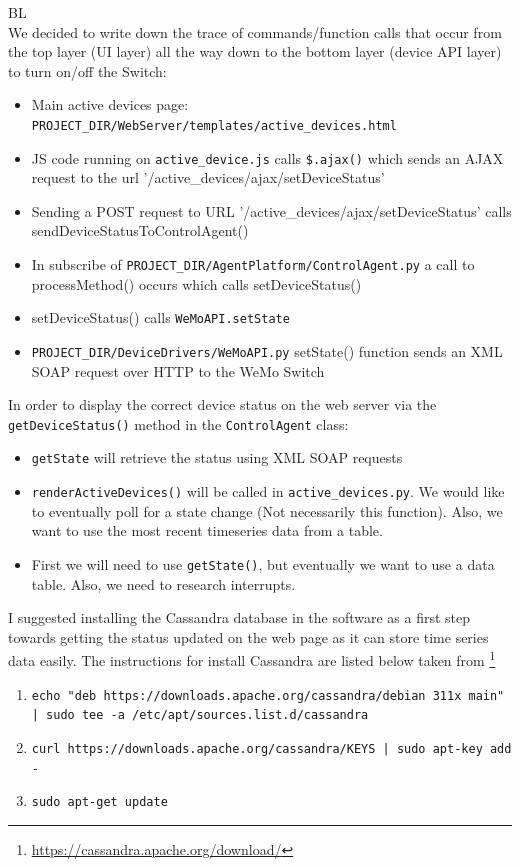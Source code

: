 \documentclass[fontsize=11pt, %
                             paper=letter, %
                             openany, %
                             captions=tableheading,
                             index=totoc,
                             hyperref]{labbook}
\begin{document}
BL\\
We decided to write down the trace of commands/function calls that occur from the top layer (UI layer) all the way down to the bottom layer (device API layer) to turn on/off the Switch:
\begin{itemize}
\item Main active devices page: \texttt{PROJECT\_DIR/WebServer/templates/active\_devices.html}
\item JS code running on \texttt{active\_device.js} calls \texttt{\$.ajax()} which sends an AJAX request to the url '/active\_devices/ajax/setDeviceStatus'
\item Sending a POST request to URL '/active\_devices/ajax/setDeviceStatus' calls sendDeviceStatusToControlAgent()
\item In subscribe of \texttt{PROJECT\_DIR/AgentPlatform/ControlAgent.py} a call to processMethod() occurs which calls setDeviceStatus()
\item setDeviceStatus() calls \texttt{WeMoAPI.setState}
\item \texttt{PROJECT\_DIR/DeviceDrivers/WeMoAPI.py} setState() function sends an XML SOAP request over HTTP to the WeMo Switch
\end{itemize}
In order to display the correct device status on the web server via the \texttt{getDeviceStatus()} method in the \texttt{ControlAgent} class:
\begin{itemize}
\item \texttt{getState} will retrieve the status using XML SOAP requests
\item \texttt{renderActiveDevices()} will be called in \texttt{active\_devices.py}. We would like to eventually poll for a state change (Not necessarily this function). Also, we want to use the most recent timeseries data from a table.
\item First we will need to use \texttt{getState()}, but eventually we want to use a data table. Also, we need to research interrupts. 
\end{itemize}
I suggested installing the Cassandra database in the software as a first step towards getting the status updated on the web page as it can store time series data easily. The instructions for install Cassandra are listed below taken from \footnote{\url{https://cassandra.apache.org/download/}}
\begin{enumerate}
\item \texttt{echo "deb https://downloads.apache.org/cassandra/debian 311x main" | sudo tee -a /etc/apt/sources.list.d/cassandra}
\item \texttt{curl https://downloads.apache.org/cassandra/KEYS | sudo apt-key add -}
\item \texttt{sudo apt-get update}
\end{enumerate}
\end{document}
